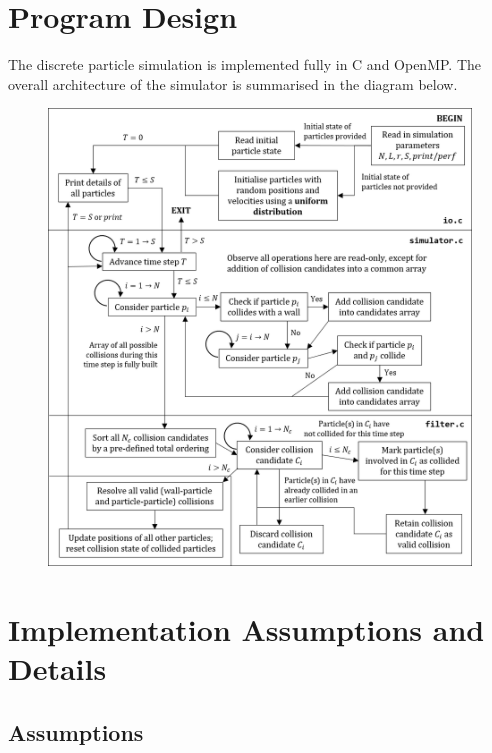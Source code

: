 \documentclass[12pt]{article}
\begin{document}
\maketitle
\setcounter{tocdepth}{1}
\tableofcontents

\pagebreak
\section{Program Design}

The discrete particle simulation is implemented fully in C and OpenMP. The overall architecture of the simulator is summarised in the diagram below.

\begin{figure}[hb]
\includegraphics{chap1Flowchart}
\centering
\end{figure}

\pagebreak

\section{Implementation Assumptions and Details}

\subsection{Assumptions}
\end{document}

